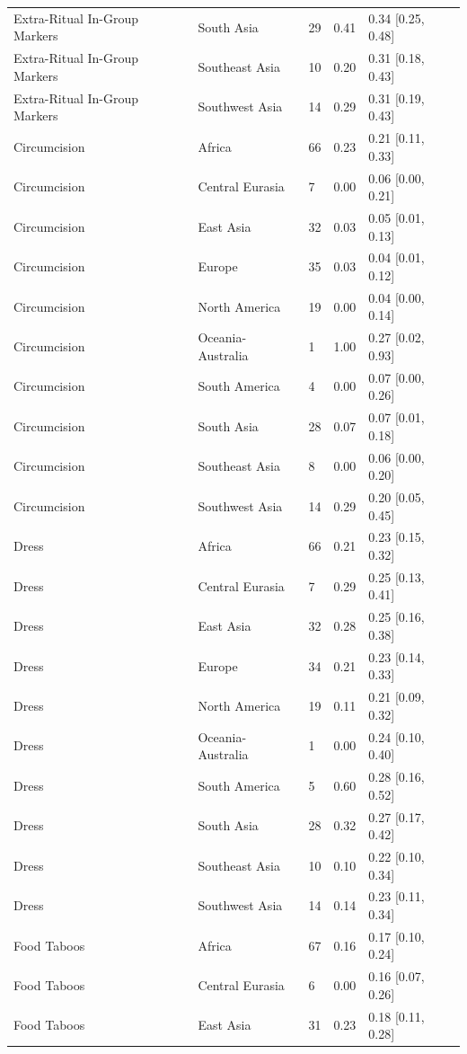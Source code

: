 \begin{longtable}{lllll}
Extra-Ritual In-Group Markers & South Asia & 29 & 0.41 & 0.34 [0.25, 0.48] \\
Extra-Ritual In-Group Markers & Southeast Asia & 10 & 0.20 & 0.31 [0.18, 0.43] \\
Extra-Ritual In-Group Markers & Southwest Asia & 14 & 0.29 & 0.31 [0.19, 0.43] \\
Circumcision & Africa & 66 & 0.23 & 0.21 [0.11, 0.33] \\
Circumcision & Central Eurasia & 7 & 0.00 & 0.06 [0.00, 0.21] \\
Circumcision & East Asia & 32 & 0.03 & 0.05 [0.01, 0.13] \\
Circumcision & Europe & 35 & 0.03 & 0.04 [0.01, 0.12] \\
Circumcision & North America & 19 & 0.00 & 0.04 [0.00, 0.14] \\
Circumcision & Oceania-Australia & 1 & 1.00 & 0.27 [0.02, 0.93] \\
Circumcision & South America & 4 & 0.00 & 0.07 [0.00, 0.26] \\
Circumcision & South Asia & 28 & 0.07 & 0.07 [0.01, 0.18] \\
Circumcision & Southeast Asia & 8 & 0.00 & 0.06 [0.00, 0.20] \\
Circumcision & Southwest Asia & 14 & 0.29 & 0.20 [0.05, 0.45] \\
Dress & Africa & 66 & 0.21 & 0.23 [0.15, 0.32] \\
Dress & Central Eurasia & 7 & 0.29 & 0.25 [0.13, 0.41] \\
Dress & East Asia & 32 & 0.28 & 0.25 [0.16, 0.38] \\
Dress & Europe & 34 & 0.21 & 0.23 [0.14, 0.33] \\
Dress & North America & 19 & 0.11 & 0.21 [0.09, 0.32] \\
Dress & Oceania-Australia & 1 & 0.00 & 0.24 [0.10, 0.40] \\
Dress & South America & 5 & 0.60 & 0.28 [0.16, 0.52] \\
Dress & South Asia & 28 & 0.32 & 0.27 [0.17, 0.42] \\
Dress & Southeast Asia & 10 & 0.10 & 0.22 [0.10, 0.34] \\
Dress & Southwest Asia & 14 & 0.14 & 0.23 [0.11, 0.34] \\
Food Taboos & Africa & 67 & 0.16 & 0.17 [0.10, 0.24] \\
Food Taboos & Central Eurasia & 6 & 0.00 & 0.16 [0.07, 0.26] \\
Food Taboos & East Asia & 31 & 0.23 & 0.18 [0.11, 0.28] \\

\end{longtable}
